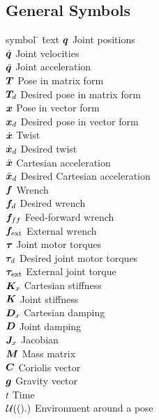 \subsection*{General Symbols}
\begin{tabbing}
symbol \= \hspace{1.5cm} \= text \kill
%
$\boldsymbol{q}$ \> \> Joint positions \\[1.1ex]
$\dot{\boldsymbol{q}}$ \> \> Joint velocities \\[1.1ex]
$\ddot{\boldsymbol{q}}$ \> \> Joint acceleration \\[1.1ex]
$\boldsymbol{T}$ \> \> Pose in matrix form \\[1.1ex]
$\boldsymbol{T}_d$ \> \> Desired pose in matrix form \\[1.1ex]
$\boldsymbol{x}$ \> \> Pose in vector form \\[1.1ex]
$\boldsymbol{x}_d$ \> \> Desired pose in vector form \\[1.1ex]
$\dot{\boldsymbol{x}}$ \> \> Twist \\[1.1ex]
$\dot{\boldsymbol{x}}_d$ \> \> Desired twist \\[1.1ex]
$\ddot{\boldsymbol{x}}$ \> \> Cartesian acceleration \\[1.1ex]
$\ddot{\boldsymbol{x}}_d$ \> \> Desired Cartesian acceleration \\[1.1ex]
$\boldsymbol{f}$ \> \> Wrench \\[1.1ex]
$\boldsymbol{f}_d$ \> \> Desired wrench \\[1.1ex]
$\boldsymbol{f}_{ff}$ \> \> Feed-forward wrench \\[1.1ex]
$\boldsymbol{f}_\text{ext}$ \> \> External wrench \\[1.1ex]
$\boldsymbol{\tau}$ \> \> Joint motor torques \\[1.1ex]
$\boldsymbol{\tau}_d$ \> \> Desired joint motor torques \\[1.1ex]
$\boldsymbol{\tau}_\text{ext}$ \> \> External joint torque \\[1.1ex]
$\boldsymbol{K}_x$ \> \> Cartesian stiffness \\[1.1ex]
$\boldsymbol{K}$ \> \> Joint stiffness \\[1.1ex]
$\boldsymbol{D}_x$ \> \> Cartesian damping \\[1.1ex]
$\boldsymbol{D}$ \> \> Joint damping \\[1.1ex]
$\boldsymbol{J}_x$ \> \> Jacobian \\[1.1ex]
$\boldsymbol{M}$ \> \> Mass matrix \\[1.1ex]
$\boldsymbol{C}$ \> \> Coriolis vector \\[1.1ex]
$\boldsymbol{g}$ \> \> Gravity vector \\[1.1ex]
$t$ \> \> Time \\[1.1ex]
$\mathcal{U}(().)$ \> \> Environment around a pose \\[1.1ex]
\end{tabbing}
